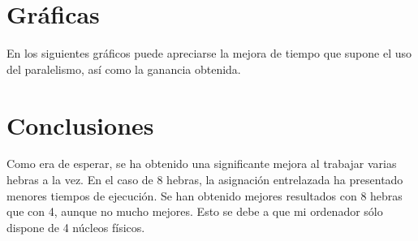 \documentclass[12pt,spanish]{article}
\begin{document}
\begin{figure}[H]
  \centering
\end{figure}

\section{Gráficas}
En los siguientes gráficos puede apreciarse la mejora de tiempo que
supone el uso del paralelismo, así como la ganancia obtenida.

\begin{figure}[H]
  \centering
\end{figure}

\begin{figure}[H]
  \centering
\end{figure}

\begin{figure}[H]
  \centering
\end{figure}

\section{Conclusiones}
Como era de esperar, se ha obtenido una significante mejora al
trabajar varias hebras a la vez. En el caso de 8 hebras, la asignación
entrelazada ha presentado menores tiempos de ejecución. Se han
obtenido mejores resultados con 8 hebras que con 4, aunque no mucho
mejores. Esto se debe a que mi ordenador sólo dispone de 4 núcleos
físicos.
\end{document}
